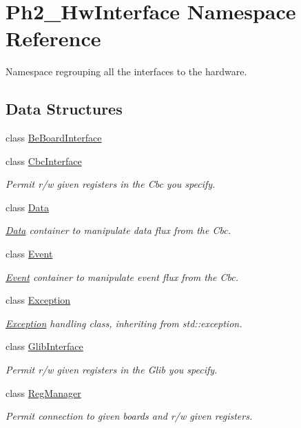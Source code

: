 \hypertarget{namespace_ph2___hw_interface}{\section{Ph2\-\_\-\-Hw\-Interface Namespace Reference}
\label{namespace_ph2___hw_interface}
}


Namespace regrouping all the interfaces to the hardware.  


\subsection*{Data Structures}
\begin{DoxyCompactItemize}
\item 
class \hyperlink{class_ph2___hw_interface_1_1_be_board_interface}{Be\-Board\-Interface}
\item 
class \hyperlink{class_ph2___hw_interface_1_1_cbc_interface}{Cbc\-Interface}
\begin{DoxyCompactList}\small\item\em Permit r/w given registers in the Cbc you specify. \end{DoxyCompactList}\item 
class \hyperlink{class_ph2___hw_interface_1_1_data}{Data}
\begin{DoxyCompactList}\small\item\em \hyperlink{class_ph2___hw_interface_1_1_data}{Data} container to manipulate data flux from the Cbc. \end{DoxyCompactList}\item 
class \hyperlink{class_ph2___hw_interface_1_1_event}{Event}
\begin{DoxyCompactList}\small\item\em \hyperlink{class_ph2___hw_interface_1_1_event}{Event} container to manipulate event flux from the Cbc. \end{DoxyCompactList}\item 
class \hyperlink{class_ph2___hw_interface_1_1_exception}{Exception}
\begin{DoxyCompactList}\small\item\em \hyperlink{class_ph2___hw_interface_1_1_exception}{Exception} handling class, inheriting from std\-::exception. \end{DoxyCompactList}\item 
class \hyperlink{class_ph2___hw_interface_1_1_glib_interface}{Glib\-Interface}
\begin{DoxyCompactList}\small\item\em Permit r/w given registers in the Glib you specify. \end{DoxyCompactList}\item 
class \hyperlink{class_ph2___hw_interface_1_1_reg_manager}{Reg\-Manager}
\begin{DoxyCompactList}\small\item\em Permit connection to given boards and r/w given registers. \end{DoxyCompactList}\end{DoxyCompactItemize}
